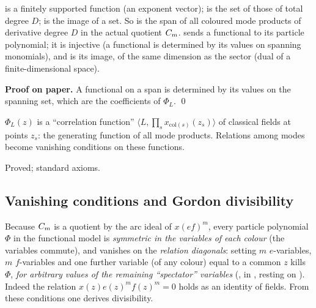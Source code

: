 \begin{dictionary}
 is a finitely supported function (an exponent vector);  is the set of those of
total degree $D$;  is the image of a set. So  is the span of all coloured mode
products of derivative degree $D$ in the actual quotient $C_m$.  sends a functional to its
particle polynomial; it is injective (a functional is determined by its values on spanning monomials), and
 is its image, of the same dimension as the sector (dual of a finite-dimensional space).
\end{dictionary}

\textbf{Proof on paper.} A functional on a span is determined by its values on the spanning set, which are the
coefficients of $\Phi_L$. \qed

\begin{physics}
$\Phi_L(z)$ is a ``correlation function'' $\langle L,\prod_s x_{\mathrm{col}(s)}(z_s)\rangle$ of classical fields at
points $z_s$: the generating function of all mode products. Relations among modes become vanishing conditions
on these functions.
\end{physics}

\begin{status}
Proved; standard axioms.
\end{status}

\subsection{Vanishing conditions and Gordon divisibility}

Because $C_m$ is a quotient by the arc ideal of $x(ef)^m$, every particle polynomial $\Phi$ in the functional
model is \emph{symmetric in the variables of each colour} (the variables commute), and vanishes on the
\emph{relation diagonals}: setting $m$ $e$-variables, $m$ $f$-variables and one further variable (of any
colour) equal to a common $z$ kills $\Phi$, \emph{for arbitrary values of the remaining ``spectator''
variables} (, in , resting on
). Indeed the
relation $x(z)e(z)^mf(z)^m=0$ holds as an identity of fields. From these conditions one derives divisibility.

